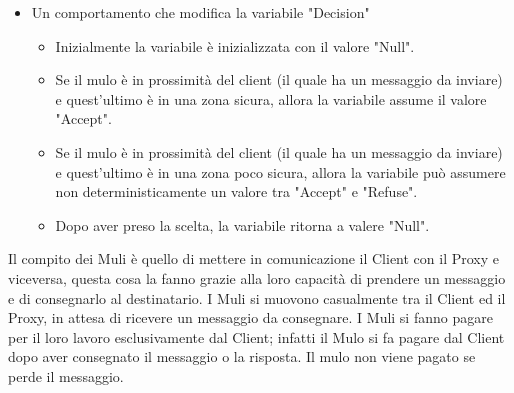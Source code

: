 \documentclass[13pt,a4paper]{article}
\begin{document}
\begin{itemize}
\begin{itemize}
	\item Un comportamento che modifica la variabile "Decision"
	\begin{itemize}
		\item Inizialmente la variabile è inizializzata con il valore "Null".
		\item Se il mulo è in prossimità del client (il quale ha un messaggio da inviare) e quest'ultimo è in una zona sicura, allora la variabile assume il valore "Accept". 
		\item Se il mulo è in prossimità del client (il quale ha un messaggio da inviare) e quest'ultimo è in una zona poco sicura, allora la variabile può assumere non deterministicamente un valore tra "Accept" e "Refuse".
		\item Dopo aver preso la scelta, la variabile ritorna a valere "Null".
	\end{itemize}
	\end{itemize}
	Il compito dei Muli è  quello di mettere in comunicazione il Client con il Proxy e viceversa, questa cosa la fanno grazie alla loro capacità di prendere un messaggio e di consegnarlo al destinatario. I Muli si muovono casualmente tra il Client ed il Proxy, in attesa di ricevere un messaggio da consegnare. I Muli si fanno pagare per il loro lavoro esclusivamente dal Client; infatti il Mulo si fa pagare dal Client dopo aver consegnato il messaggio o la risposta. Il mulo non viene pagato se perde il messaggio.
	

\end{itemize}
\end{document}
